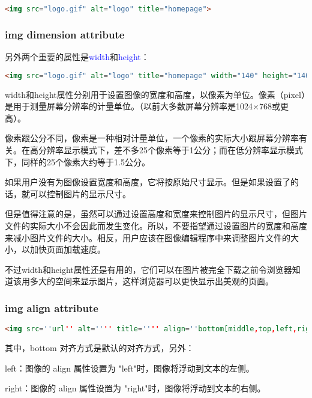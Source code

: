 \begin{lstlisting}[language=HTML]
	<img src="logo.gif" alt="logo" title="homepage">
\end{lstlisting}

\subsubsection{img dimension attribute}

另外两个重要的属性是\textcolor{Blue}{width}和\textcolor{Blue}{height}：

\begin{lstlisting}[language=HTML]
	<img src="logo.gif" alt="logo" title="homepage" width="140" height="140">
\end{lstlisting}

width和height属性分别用于设置图像的宽度和高度，以像素为单位。像素（pixel）是用于测量屏幕分辨率的计量单位。（以前大多数屏幕分辨率是1024×768或更高）。

像素跟公分不同，像素是一种相对计量单位，一个像素的实际大小跟屏幕分辨率有关。在高分辨率显示模式下，差不多25个像素等于1公分；而在低分辨率显示模式下，同样的25个像素大约等于1.5公分。

如果用户没有为图像设置宽度和高度，它将按原始尺寸显示。但是如果设置了的话，就可以控制图片的显示尺寸。

但是值得注意的是，虽然可以通过设置高度和宽度来控制图片的显示尺寸，但图片文件的实际大小不会因此而发生变化。所以，不要指望通过设置图片的宽度和高度来减小图片文件的大小。相反，用户应该在图像编辑程序中来调整图片文件的大小，以加快页面加载速度。

不过width和height属性还是有用的，它们可以在图片被完全下载之前令浏览器知道该用多大的空间来显示图片，这样浏览器可以更快显示出美观的页面。

\subsubsection{img align attribute}

\begin{lstlisting}[language=HTML]
	<img src=''url'' alt='''' title='''' align=''bottom[middle,top,left,right]''>
\end{lstlisting}

其中，bottom 对齐方式是默认的对齐方式，另外：

\begin{compactitem}
\item left：图像的 align 属性设置为 "left"时，图像将浮动到文本的左侧。
\item right：图像的 align 属性设置为 "right"时，图像将浮动到文本的右侧。
\end{compactitem}




